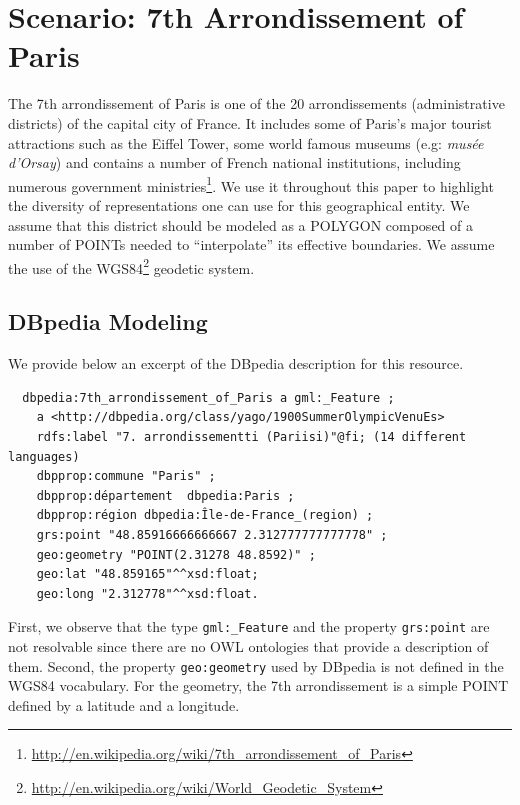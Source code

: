 \documentclass[a4paper,11pt]{report}
\begin{document}
\section{Scenario: 7th Arrondissement of Paris}                      \label{sec:scenario}
The 7th arrondissement of Paris is one of the 20 arrondissements (administrative districts) of the capital city of France. It includes some of Paris's major tourist attractions such as the Eiffel Tower, some world famous museums (e.g: \textit{musée d'Orsay}) and contains a number of French national institutions, including numerous government ministries\footnote{\url{http://en.wikipedia.org/wiki/7th_arrondissement_of_Paris}}. We use it throughout this paper to highlight the diversity of representations one can use for this geographical entity. We assume that this district should be modeled as a POLYGON composed of a number of POINTs needed to ``interpolate'' its effective boundaries. We assume the use of the WGS84\footnote{\url{http://en.wikipedia.org/wiki/World_Geodetic_System}} geodetic system.

\subsection{DBpedia Modeling}
We provide below an excerpt of the DBpedia description for this resource.
{\scriptsize
\begin{verbatim}
  dbpedia:7th_arrondissement_of_Paris a gml:_Feature ;
    a <http://dbpedia.org/class/yago/1900SummerOlympicVenuEs>
    rdfs:label "7. arrondissementti (Pariisi)"@fi; (14 different languages)
    dbpprop:commune "Paris" ;
    dbpprop:département  dbpedia:Paris ;
    dbpprop:région dbpedia:Île-de-France_(region) ;
    grs:point "48.85916666666667 2.312777777777778" ;
    geo:geometry "POINT(2.31278 48.8592)" ;
    geo:lat "48.859165"^^xsd:float;
    geo:long "2.312778"^^xsd:float.
\end{verbatim}
}
First, we observe that the type \texttt{gml:\_Feature} and the property \texttt{grs:point} are not resolvable since there are no OWL ontologies that provide a description of them. Second, the property \texttt{geo:geometry} used by DBpedia is not defined in the WGS84 vocabulary. For the geometry, the 7th arrondissement is a simple POINT defined by a latitude and a longitude.
\end{document}
